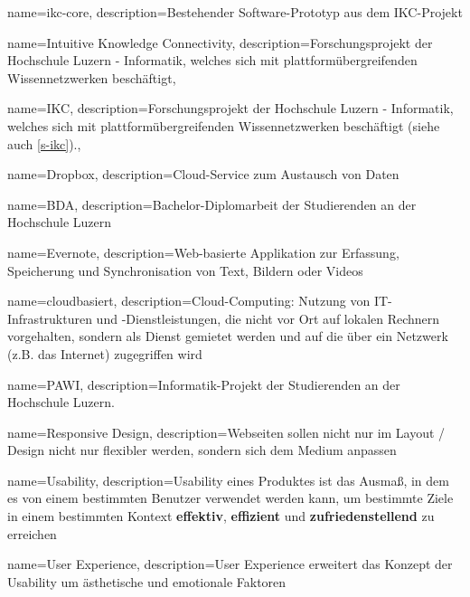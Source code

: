 \usepackage[acronym,noredefwarn,toc]{glossaries}
\makenoidxglossaries

{
    name=ikc-core,
    description={Bestehender Software-Prototyp aus dem IKC-Projekt}
}

{
    name=Intuitive Knowledge Connectivity,
    description={Forschungsprojekt der Hochschule Luzern - Informatik, welches sich mit plattformübergreifenden Wissennetzwerken beschäftigt},
}

{
    name=IKC,
    description={Forschungsprojekt der Hochschule Luzern - Informatik, welches sich mit plattformübergreifenden Wissennetzwerken beschäftigt (siehe auch \autoref{s-ikc}).},
}


{
    name=Dropbox,
    description={Cloud-Service zum Austausch von Daten}
    \cite{dropbox}
}

{
    name=BDA,
    description={Bachelor-Diplomarbeit der Studierenden an der Hochschule Luzern}
}


{
    name=Evernote,
    description={Web-basierte Applikation zur Erfassung, Speicherung und Synchronisation von Text, Bildern oder Videos}
    \cite{evernote}
}

{
    name=cloudbasiert,
    description={Cloud-Computing: Nutzung von IT-Infrastrukturen und -Dienstleistungen, die nicht vor Ort auf lokalen Rechnern vorgehalten, sondern als Dienst gemietet werden und auf die über ein Netzwerk (z.B. das Internet) zugegriffen wird} \cite{duden.de}
}

{
    name=PAWI,
    description={Informatik-Projekt der Studierenden an der Hochschule Luzern.}
}

{
    name=Responsive Design,
    description={Webseiten sollen nicht nur im Layout / Design nicht nur flexibler werden, sondern sich dem Medium anpassen}
    \cite[S.8]{responsive-webdesign}
}

{
    name=Usability,
    description={Usability eines Produktes ist das Ausmaß, in dem es von einem bestimmten Benutzer verwendet werden kann, um bestimmte Ziele in einem bestimmten Kontext \textbf{effektiv}, \textbf{effizient} und \textbf{zufriedenstellend} zu erreichen}
    \cite{usab}
}

{
    name=User Experience,
    description={User Experience erweitert das Konzept der \gls{Usability} um ästhetische und emotionale Faktoren}
    \cite{ux}
}

